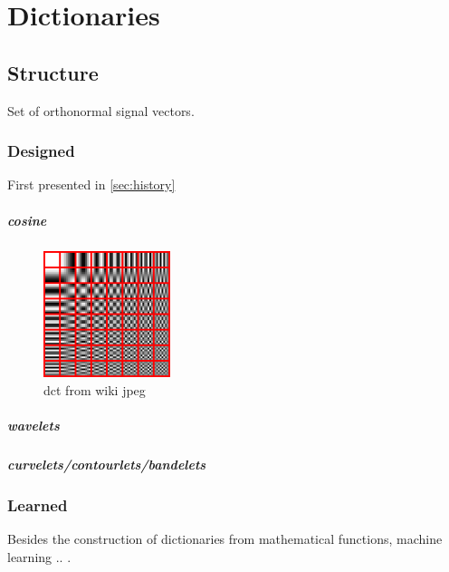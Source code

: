 \chapter{Dictionaries}

\section{Structure}
Set of orthonormal signal vectors.
\subsection{Designed}

First presented in \ref{sec:history}

\paragraph{cosine}
\begin{figure}
\includegraphics[width = 0.33\textwidth]{images/dct.png}
\caption{dct from wiki jpeg}
\label{fig:dct}
\end{figure}

\paragraph{wavelets}
\paragraph{curvelets/contourlets/bandelets}


\subsection{Learned}


Besides the construction of dictionaries from mathematical functions, machine
learning .. .


